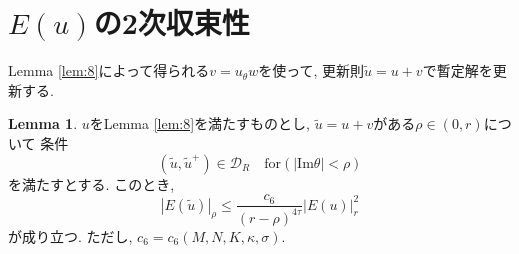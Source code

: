 \documentclass[a4paper]{ujarticle}
\numberwithin{equation}{section}
\theoremstyle{definition}
\newtheorem{lemma}{Lemma}
\begin{document}
        \section{$E(u)$の2次収束性}
        Lemma \ref{lem:8}によって得られる$v = u_{\theta} w$を使って,
        更新則$\tilde{u} = u + v$で暫定解を更新する.
        \begin{lemma}
            $u$をLemma \ref{lem:8}を満たすものとし, $\tilde{u} = u + v$がある$\rho \in (0, r)$について
            条件
            \begin{equation} 
                (\tilde{u}, \tilde{u}^{+}) \in \mathcal{D}_{R} \quad \text{for} (|\mathrm{Im} \theta| < \rho)
            \end{equation}
            を満たすとする. このとき,
            \begin{equation} \label{eq:29}
                |E(\tilde{u})|_{\rho} \leq \frac{c_6}{(r - \rho)^{4 \tau}} |E(u)|^2_{r}
            \end{equation}
            が成り立つ. ただし, $c_6 = c_6(M, N, K, \kappa, \sigma)$.
        \end{lemma}
\end{document}

